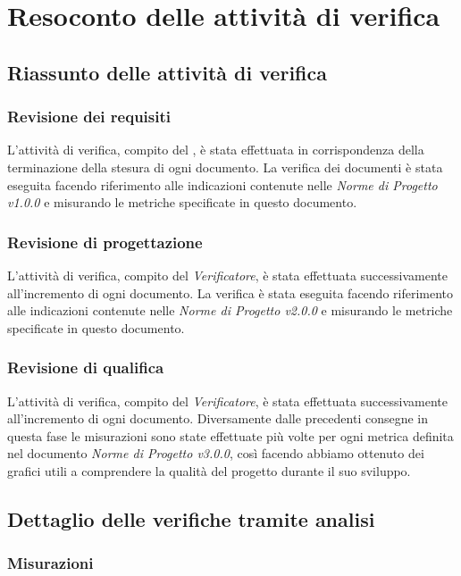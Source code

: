\section{Resoconto delle attività di verifica}
	\subsection{Riassunto delle attività di verifica}
	\subsubsection{Revisione dei requisiti}
	L'attività di verifica, compito del \emph{}, è stata effettuata in corrispondenza della terminazione della stesura di ogni documento. La verifica dei documenti è stata eseguita facendo riferimento alle indicazioni contenute nelle \emph{Norme di Progetto v1.0.0} e misurando le metriche specificate in questo documento.
	\subsubsection{Revisione di progettazione}
	L'attività di verifica, compito del \emph{Verificatore}, è stata effettuata successivamente all'incremento di ogni documento. La verifica è stata eseguita facendo riferimento alle indicazioni contenute nelle \emph{Norme di Progetto v2.0.0} e misurando le metriche specificate in questo documento.
	\subsubsection{Revisione di qualifica}
	L'attività di verifica, compito  del \emph{Verificatore}, è stata effettuata successivamente all'incremento di ogni documento.
	Diversamente dalle precedenti consegne in questa fase le misurazioni sono state effettuate più volte per ogni metrica definita nel documento \emph{Norme di Progetto v3.0.0}, così facendo abbiamo ottenuto dei grafici utili a comprendere la qualità del progetto durante il suo sviluppo.
	
	\subsection{Dettaglio delle verifiche tramite analisi}
	\label{AdR_Dettaglio}
	\subsubsection{Misurazioni}
	\label{misure}
